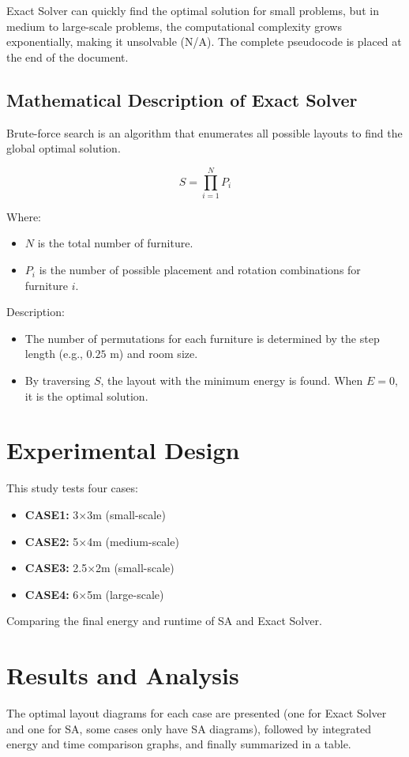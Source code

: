 \documentclass[conference]{IEEEtran}
\begin{document}
Exact Solver can quickly find the optimal solution for small problems, but in medium to large-scale problems, the computational complexity grows exponentially, making it unsolvable (N/A). The complete pseudocode is placed at the end of the document.

\subsection{Mathematical Description of Exact Solver}
Brute-force search is an algorithm that enumerates all possible layouts to find the global optimal solution.

\[
S = \prod_{i=1}^{N} P_i
\]

Where:
\begin{itemize}
    \item \( N \) is the total number of furniture.
    \item \( P_i \) is the number of possible placement and rotation combinations for furniture \( i \).
\end{itemize}

Description:
\begin{itemize}
    \item The number of permutations for each furniture is determined by the step length (e.g., \( 0.25 \) m) and room size.
    \item By traversing \( S \), the layout with the minimum energy is found. When \( E = 0 \), it is the optimal solution.
\end{itemize}

\FloatBarrier %

\section{Experimental Design}
This study tests four cases:
\begin{itemize}
    \item \textbf{CASE1:} 3×3m (small-scale)
    \item \textbf{CASE2:} 5×4m (medium-scale)
    \item \textbf{CASE3:} 2.5×2m (small-scale)
    \item \textbf{CASE4:} 6×5m (large-scale)
\end{itemize}

Comparing the final energy and runtime of SA and Exact Solver.

\section{Results and Analysis}
The optimal layout diagrams for each case are presented (one for Exact Solver and one for SA, some cases only have SA diagrams), followed by integrated energy and time comparison graphs, and finally summarized in a table.
\end{document}
